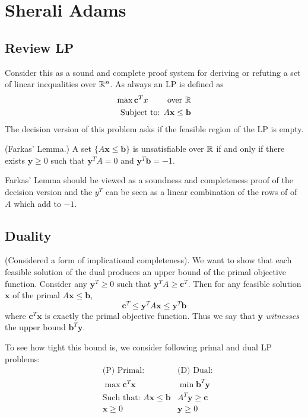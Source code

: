 



\section{Sherali Adams}
\subsection{Review LP}
Consider this as a sound and complete proof system for deriving or refuting a set of linear inequalities over $\mathbb{R}^n$. As always an LP is defined as 
\begin{align*}
\max \mathbf{c}^Tx \qquad \mbox{ over }\mathbb{R}\\
\mbox{Subject to: }A\mathbf{x} \leq \mathbf{b}
\end{align*}
The decision version of this problem asks if the feasible region of the LP is empty.

\begin{lemma}
(Farkas' Lemma.) A set $\{A\mathbf{x} \leq \mathbf{b}\}$ is unsatisfiable over $\mathbb{R}$ if and only if there exists $\mathbf{y} \geq 0$ such that $\mathbf{y}^T A = 0$ and $\mathbf{y}^T\mathbf{b} = -1$. 
\end{lemma}

Farkas' Lemma should be viewed as a soundness and completeness proof of the decision version and the $y^T$ can be seen as a linear combination of the rows of of $A$ which add to $-1$.

\subsection{Duality}
(Considered a form of implicational completeness). We want to show that each feasible solution of the dual produces an upper bound of the primal objective function. Consider any $\mathbf{y}^T \geq 0$ such that $\mathbf{y}^TA \geq \mathbf{c}^T$. Then for any feasible solution $\mathbf{x}$ of the primal $A\mathbf{x} \leq \mathbf{b}$, 
\[\mathbf{c}^T \leq \mathbf{y}^TA\mathbf{x} \leq \mathbf{y}^T\mathbf{b}\]
where $\mathbf{c}^T\mathbf{x}$ is exactly the primal objective function. Thus we say that $\mathbf{y}$ \emph{witnesses} the upper bound $\mathbf{b}^T\mathbf{y}$.

To see how tight this bound is, we consider following primal and dual LP problems:
\begin{align*}
&\mbox{(P) Primal:} &\mbox{(D) Dual:}\\
&\max \mathbf{c}^T\mathbf{x} &\min \mathbf{b}^T\mathbf{y}\\
&\mbox{Such that: } A\mathbf{x} \leq \mathbf{b} &A^T \mathbf{y} \geq \mathbf{c}\\
&\mathbf{x} \geq 0 &\mathbf{y} \geq 0
\end{align*}

